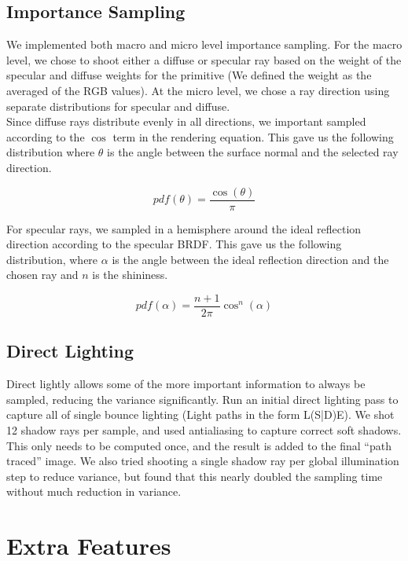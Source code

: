 \documentclass[11pt]{article}
\begin{document}
\subsection{Importance Sampling}

We implemented both macro and micro level importance sampling. For the macro level, we chose to shoot either a diffuse or specular ray based on the weight of the specular and diffuse weights for the primitive (We defined the weight as the averaged of the RGB values). At the micro level, we chose a ray direction using separate distributions for specular and diffuse.\\

Since diffuse rays distribute evenly in all directions, we important sampled according to the $\cos$ term in the rendering equation. This gave us the following distribution where $\theta$ is the angle between the surface normal and the selected ray direction.

\begin{equation}
	pdf(\theta) = \frac{\cos(\theta)}{\pi}
\end{equation}

For specular rays, we sampled in a hemisphere around the ideal reflection direction according to the specular BRDF. This gave us the following distribution, where $\alpha$ is the angle between the ideal reflection direction and the chosen ray and $n$ is the shininess.

\begin{equation}
	pdf(\alpha) = \frac{n+1}{2\pi}\cos^{n}(\alpha)
\end{equation}


\subsection{Direct Lighting}
Direct lightly allows some of the more important information to always be sampled, reducing the variance significantly. Run an initial direct lighting pass to capture all of single bounce lighting (Light paths in the form L(S|D)E). We shot 12 shadow rays per sample, and used antialiasing to capture correct soft shadows. This only needs to be computed once, and the result is added to the final ``path traced'' image. We also tried shooting a single shadow ray per global illumination step to reduce variance, but found that this nearly doubled the sampling time without much reduction in variance. 


\section{Extra Features}
\end{document}
